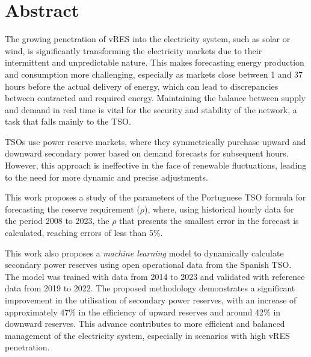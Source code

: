 \chapter{Abstract}
\justifying

The growing penetration of \gls{vRES} into the electricity system, such as solar or wind, is significantly transforming the electricity markets due to their intermittent and unpredictable nature. This makes forecasting energy production and consumption more challenging, especially as markets close between 1 and 37 hours before the actual delivery of energy, which can lead to discrepancies between contracted and required energy. Maintaining the balance between supply and demand in real time is vital for the security and stability of the network, a task that falls mainly to the \gls{TSO}.\par
\gls{TSO}s use power reserve markets, where they symmetrically purchase upward and downward secondary power based on demand forecasts for subsequent hours. However, this approach is ineffective in the face of renewable fluctuations, leading to the need for more dynamic and precise adjustments.\par
This work proposes a study of the parameters of the Portuguese \gls{TSO} formula for forecasting the reserve requirement ($\rho$), where, using historical hourly data for the period 2008 to 2023, the $\rho$ that presents the smallest error in the forecast is calculated, reaching errors of less than 5\%.\par
This work also proposes a \textit{machine learning} model to dynamically calculate secondary power reserves using open operational data from the Spanish \gls{TSO}. The model was trained with data from 2014 to 2023 and validated with reference data from 2019 to 2022. The proposed methodology demonstrates a significant improvement in the utilisation of secondary power reserves, with an increase of approximately 47\% in the efficiency of upward reserves and around 42\% in downward reserves. This advance contributes to more efficient and balanced management of the electricity system, especially in scenarios with high \gls{vRES} penetration.



\vspace{0.5cm} %

